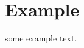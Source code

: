 \maketitle
\hypersetup{hidelinks}
\tableofcontents
\newpage

\section{Example}\label{sec:example}
some example text.

